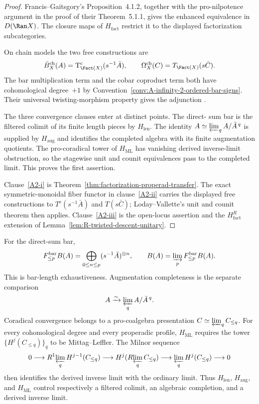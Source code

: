\begin{proof}
Francis--Gaitsgory's Proposition~4.1.2, together with the
pro-nilpotence argument in the proof of their Theorem~5.1.1, gives
the enhanced equivalence in $D(\Ran X)$.
The closure maps of $H_{\mathrm{fact}}$ restrict it to the displayed
factorization subcategories.

On chain models the two free constructions are
\[
 \Bbarch_X(A)=\Tc_{\Fact(X)}(s^{-1}\bar A),
 \qquad
 \Omegach_X(C)=T_{\Fact(X)}(s\bar C).
\]
The bar multiplication term and the cobar coproduct term both have
cohomological degree~$+1$ by
Convention~\ref{conv:A-infinity-2-ordered-bar-signs}.  Their universal
twisting-morphism property gives the adjunction
\cite[Theorem~2.2.9]{LV12}.

The three convergence clauses enter at distinct points.  The direct-
sum bar is the filtered colimit of its finite length pieces by
$H_{\mathrm{len}}$.  The identity
$A\simeq\varprojlim_qA/\bar A^{\,q}$ is supplied by
$H_{\mathrm{aug}}$ and identifies the completed algebra with its
finite augmentation quotients.  The pro-coradical tower of
$H_{\mathrm{ML}}$ has vanishing derived inverse-limit obstruction, so
the stagewise unit and counit equivalences pass to the completed limit.
This proves the first assertion.

Clause~\ref{A2-i} is Theorem~\ref{thm:factorization-properad-transfer}.
The exact symmetric-monoidal fiber functor in clause~\ref{A2-ii}
carries the displayed free constructions to $T^c(s^{-1}\bar A)$ and
$T(s\bar C)$; Loday--Vallette's unit and counit theorem then applies.
Clause~\ref{A2-iii} is the open-locus assertion and the
$H_{\mathrm{fact}}^{R}$ extension of
Lemma~\ref{lem:R-twisted-descent-unitary}.
\end{proof}

\begin{remark}
\label{rem:A-inf-2-ml-step-2}
For the direct-sum bar,
\[
 F^{\mathrm{bar}}_{\leq p}B(A)
 =\bigoplus_{0\leq n\leq p}(s^{-1}\bar A)^{\otimes n},
 \qquad
 B(A)=\varinjlim_pF^{\mathrm{bar}}_{\leq p}B(A).
\]
This is bar-length exhaustiveness.  Augmentation completeness is the
separate comparison
\[
 A\xrightarrow{\sim}\varprojlim_qA/\bar A^{\,q}.
\]
Coradical convergence belongs to a pro-coalgebra presentation
$C\simeq\varprojlim_qC_{\leq q}$.  For every cohomological degree and
every properadic profile, $H_{\mathrm{ML}}$ requires the tower
$\{H^j(C_{\leq q})\}_q$ to be Mittag--Leffler.  The Milnor sequence
\[
 0\longrightarrow
 R^1\!\varprojlim_q H^{j-1}(C_{\leq q})
 \longrightarrow H^j(R\!\varprojlim_q C_{\leq q})
 \longrightarrow \varprojlim_q H^j(C_{\leq q})
 \longrightarrow0
\]
then identifies the derived inverse limit with the ordinary limit.
Thus $H_{\mathrm{len}}$, $H_{\mathrm{aug}}$, and $H_{\mathrm{ML}}$
control respectively a filtered colimit, an algebraic completion, and
a derived inverse limit.
\end{remark}

